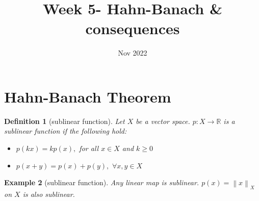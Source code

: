 \documentclass{article}
\title{Week 5- Hahn-Banach \& consequences}
\date{Nov 2022}
\newcommand{\nextline}{\hfill\break}
\newcommand{\norm}[1]{\left\|{#1}\right\|}
\newcommand{\func}[3]{\({#1}:{#2}\xrightarrow{}{#3}\)}
\newcommand{\real}{\mathbb{R}}
\newtheorem{example}{Example}[subsection]
\newtheorem{definition}[example]{Definition}
\begin{document}
\maketitle
\section{Hahn-Banach Theorem}
\begin{definition}[sublinear function]\rm\nextline
	Let \(X\) be a vector space. \func{p}{X}{\real} is a sublinear function if the following hold:
	\begin{itemize}
		\item \(p(kx)=kp(x),\) for all \(x\in X\) and \(k\geq0\)
		\item \(p(x+y)=p(x)+p(y),\,\,\forall x,y\in X\)
	\end{itemize}
\end{definition}

\begin{example}[sublinear function]\rm\nextline
    Any linear map is sublinear. \(p(x)=\norm{x}_X\) on \(X\) is also sublinear.
\end{example}
\end{document}

